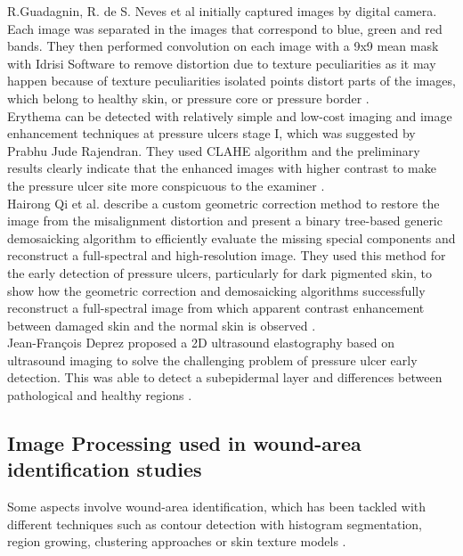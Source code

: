 R.Guadagnin, R. de S. Neves et al initially captured images by digital camera. Each image was separated in the images that correspond to blue, green and red bands. They then performed convolution on each image with a 9x9 mean mask with Idrisi Software to remove distortion due to texture peculiarities as it may happen because of texture peculiarities isolated points distort parts of the images, which belong to healthy skin, or pressure core or pressure border \cite{Santana}. \\

Erythema can be detected with relatively simple and low-cost imaging and image enhancement techniques at pressure ulcers stage I, which was suggested by Prabhu Jude Rajendran. They used CLAHE algorithm and the preliminary results clearly indicate that the enhanced images with higher contrast to make the pressure ulcer site more conspicuous to the examiner \cite{Rajendran}.\\

Hairong Qi et al. describe a custom geometric correction method to restore the image from the misalignment distortion and present a binary tree-based generic demosaicking algorithm to efficiently evaluate the missing special components
and reconstruct a full-spectral and high-resolution image. They used this method for the early detection of pressure ulcers, particularly  for dark pigmented skin, to show how the geometric correction and demosaicking algorithms successfully reconstruct a full-spectral image from which apparent contrast enhancement between damaged skin and the normal skin is observed \cite{Qi}.\\

Jean-François Deprez proposed a 2D ultrasound elastography based on ultrasound imaging to solve the challenging problem of pressure ulcer early detection. This was able to detect a subepidermal layer and differences between pathological and healthy regions \cite{Deprez}. \\

\subsection{Image Processing used in wound-area identification studies}
Some aspects involve wound-area identification, which has been tackled with different techniques such as contour detection with histogram segmentation, region growing, clustering approaches or skin texture models \cite{Veredas}.\\


